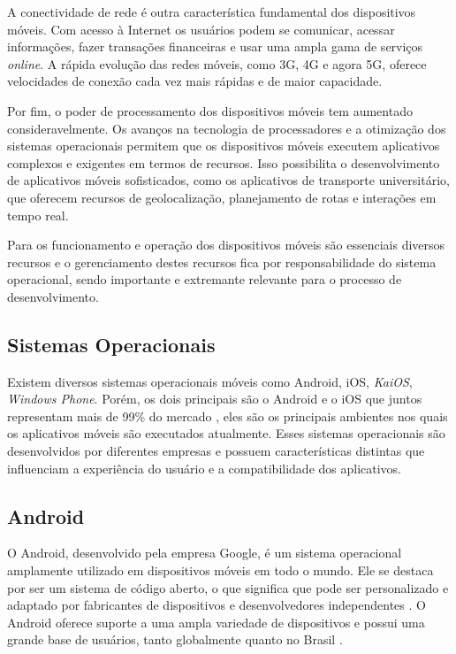 \documentclass[
    12pt,                   %
    openright,              %
    oneside,                %
    a4paper,                %
    sumario=tradicional,    %
    english,                %
    brazil,                 %
    ]{abntex2}
\begin{document}
A conectividade de rede é outra característica fundamental dos dispositivos móveis. Com acesso à Internet os usuários podem se comunicar, acessar informações, fazer transações financeiras e usar uma ampla gama de serviços \textit{online}. A rápida evolução das redes móveis, como 3G, 4G e agora 5G, oferece velocidades de conexão cada vez mais rápidas e de maior capacidade.

Por fim, o poder de processamento dos dispositivos móveis tem aumentado consideravelmente. Os avanços na tecnologia de processadores e a otimização dos sistemas operacionais permitem que os dispositivos móveis executem aplicativos complexos e exigentes em termos de recursos. Isso possibilita o desenvolvimento de aplicativos móveis sofisticados, como os aplicativos de transporte universitário, que oferecem recursos de geolocalização, planejamento de rotas e interações em tempo real.

Para os funcionamento e operação dos dispositivos móveis são essenciais diversos recursos e o gerenciamento destes recursos fica por responsabilidade do sistema operacional, sendo importante e extremante relevante para o processo de desenvolvimento.

\subsection{Sistemas Operacionais}
\label{subsec:sistemas-operacionais}

Existem diversos sistemas operacionais móveis como Android, iOS, \textit{KaiOS}, \textit{Windows Phone}. Porém, os dois principais são o Android e o iOS que juntos representam mais de 99\% do mercado \cite{statcounter}, eles são os principais ambientes nos quais os aplicativos móveis são executados atualmente. Esses sistemas operacionais são desenvolvidos por diferentes empresas e possuem características distintas que influenciam a experiência do usuário e a compatibilidade dos aplicativos.

\subsection{Android}
\label{subsubsec:android}

O Android, desenvolvido pela empresa Google, é um sistema operacional amplamente utilizado em dispositivos móveis em todo o mundo. Ele se destaca por ser um sistema de código aberto, o que significa que pode ser personalizado e adaptado por fabricantes de dispositivos e desenvolvedores independentes \cite{android}. 
O Android oferece suporte a uma ampla variedade de dispositivos e possui uma grande base de usuários, tanto globalmente quanto no Brasil \cite{statcounter}. 
\end{document}
